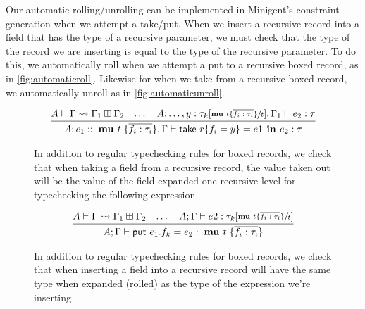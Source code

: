 Our automatic rolling/unrolling can be implemented in Minigent's constraint generation when we attempt a \textsf{take}/\textsf{put}.
When we insert a recursive record into a field that has the type of a recursive parameter, we must check that the type of the record
we are inserting is equal to the type of the recursive parameter. To do this, we automatically roll
when we attempt a \textsf{put} to a recursive boxed record, as in \autoref{fig:automaticroll}.
Likewise for when we \textsf{take} from a recursive boxed record, 
we automatically unroll as in \autoref{fig:automaticunroll}.

\begin{figure}
    \centering
    \begin{align*}
        \infer{
            A; e_1 ::\; \textbf{mu } t\; \{ \overline{f_i : \tau_i} \}, \Gamma \vdash \textsf{take } r \{ f_i = y \} = e1 \textbf{ in } e_2 : \tau
        }{
            A \vdash \Gamma \rightsquigarrow \Gamma_1 \boxplus \Gamma_2
            &
            \dots
            &
            A; \dots, y : \tau_k[\sfrac{ \textbf{mu } t \{\overline{f_i : \tau_i} \}}{t}], \Gamma_1 \vdash e_2 : \tau
        }
    \end{align*}
    \caption{In addition to regular typechecking rules for boxed records, we check that when taking a field from a recursive
             record, the value taken out will be the value of the field expanded one recursive level for typechecking the following expression}
    \label{fig:automaticunroll}
\end{figure}

\begin{figure}
    \centering
    \begin{align*}
        \infer{
            A;\Gamma \vdash \textsf{put } e_1.f_k  = e_2 : \; \textbf{mu } t\; \{ \overline{f_i : \tau_i} \}
        }{
            A \vdash \Gamma \rightsquigarrow \Gamma_1 \boxplus \Gamma_2
            &
            \dots
            &
            A;\Gamma \vdash e2 : \tau_k[\sfrac{ \textbf{mu } t \{\overline{f_i : \tau_i} \}}{t}]
        }
    \end{align*}
    \caption{In addition to regular typechecking rules for boxed records, we check that when inserting a field into a recursive
             record will have the same type when expanded (rolled) as the type of the expression we're inserting}
    \label{fig:automaticroll}
\end{figure}

